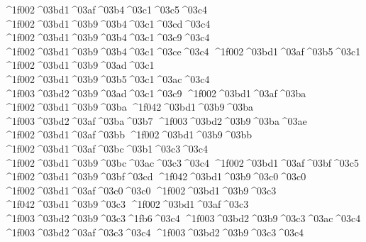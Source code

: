 {^^^^1f002^^^^03bd1^^^^03af^^^^03b4^^^^03c1^^^^03c5^^^^03c4		%
^^^^1f002^^^^03bd1^^^^03b9^^^^03b4^^^^03c1^^^^03cd^^^^03c4
^^^^1f002^^^^03bd1^^^^03b9^^^^03b4^^^^03c1^^^^03c9^^^^03c4		%
^^^^1f002^^^^03bd1^^^^03b9^^^^03b4^^^^03c1^^^^03ce^^^^03c4   	 	%
^^^^1f002^^^^03bd1^^^^03af^^^^03b5^^^^03c1   		%
^^^^1f002^^^^03bd1^^^^03b9^^^^03ad^^^^03c1
^^^^1f002^^^^03bd1^^^^03b9^^^^03b5^^^^03c1^^^^03ac^^^^03c4 		%
	^^^^1f003^^^^03bd2^^^^03b9^^^^03ad^^^^03c1^^^^03c9 		%
^^^^1f002^^^^03bd1^^^^03af^^^^03ba    		%
^^^^1f002^^^^03bd1^^^^03b9^^^^03ba
^^^^1f042^^^^03bd1^^^^03b9^^^^03ba    		%
	^^^^1f003^^^^03bd2^^^^03af^^^^03ba^^^^03b7  		%
	^^^^1f003^^^^03bd2^^^^03b9^^^^03ba^^^^03ae
^^^^1f002^^^^03bd1^^^^03af^^^^03bb    		%
^^^^1f002^^^^03bd1^^^^03b9^^^^03bb
^^^^1f002^^^^03bd1^^^^03af^^^^03bc^^^^03b1^^^^03c3^^^^03c4 		%
^^^^1f002^^^^03bd1^^^^03b9^^^^03bc^^^^03ac^^^^03c3^^^^03c4
^^^^1f002^^^^03bd1^^^^03af^^^^03bf^^^^03c5   		%
^^^^1f002^^^^03bd1^^^^03b9^^^^03bf^^^^03cd
^^^^1f042^^^^03bd1^^^^03b9^^^^03c0^^^^03c0   		%
^^^^1f002^^^^03bd1^^^^03af^^^^03c0^^^^03c0
^^^^1f002^^^^03bd1^^^^03b9^^^^03c3     		%
^^^^1f042^^^^03bd1^^^^03b9^^^^03c3    		%
^^^^1f002^^^^03bd1^^^^03af^^^^03c3
	^^^^1f003^^^^03bd2^^^^03b9^^^^03c3^^^^1fb6^^^^03c4  		%
	^^^^1f003^^^^03bd2^^^^03b9^^^^03c3^^^^03ac^^^^03c4
	^^^^1f003^^^^03bd2^^^^03af^^^^03c3^^^^03c4   		%
	^^^^1f003^^^^03bd2^^^^03b9^^^^03c3^^^^03c4
}
